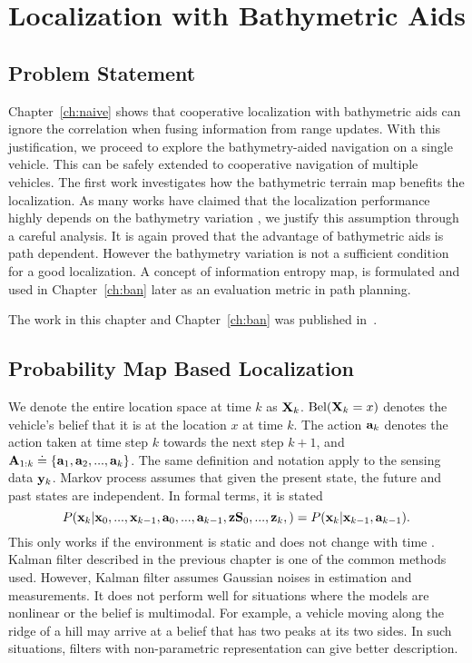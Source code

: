 \chapter{Localization with Bathymetric Aids}
\label{ch:bathymetry}


\section{Problem Statement}

Chapter~\ref{ch:naive} shows that cooperative localization with bathymetric aids can ignore the correlation when fusing information from range updates. With this justification, we proceed to explore the bathymetry-aided navigation on a single vehicle. This can be safely extended to cooperative navigation of multiple vehicles. The first work investigates how the bathymetric terrain map benefits the localization. As many works have claimed that the localization performance highly depends on the bathymetry variation \cite{Kalyan2013,Peng2016,Rodrigo2015,Galceran2013}, we justify this assumption through a careful analysis. It is again proved that the advantage of bathymetric aids is path dependent. However the bathymetry variation is not a sufficient condition for a good localization. A concept of information entropy map, is formulated and used in Chapter~\ref{ch:ban} later as an evaluation metric in path planning.

The work in this chapter and Chapter~\ref{ch:ban} was published in~\cite{Gao2018}.

\section{Probability Map Based Localization}

We denote the entire location space at time $k$ as ${\bf{X}}_k$. $\text{Bel}({\bf{X}}_k=x)$ denotes the vehicle's belief that it is at the location $x$ at time $k$. The action ${\bf{a}}_k$ denotes the action taken at time step $k$ towards the next step $k+1$, and ${\bf{A}}_{1:k}\doteq\{{\bf{a}}_1,{\bf{a}}_2,...,{\bf{a}}_k\}$. The same definition and notation apply
to the sensing data ${\bf{y}}_k$. Markov process assumes that given the present state, the future and past states are independent. In formal terms, it is stated
\begin{equation}
{P}({\bf x}_k|{\bf x}_0,...,{\bf x}_{k-1},{\bf a}_0,...,{\bf a}_{k-1},{\bf zS}_0,...,{\bf z}_{k},)={P}({\bf x}_k|{\bf x}_{k-1},{\bf a}_{k-1}).
\end{equation}
This only works if the environment is static and does not change with time \cite{Thrun2005}. Kalman filter described in the previous chapter is one of the common methods used. However, Kalman filter assumes Gaussian noises in estimation and measurements. It does not perform well for situations where the models are nonlinear or the belief is multimodal. For example, a vehicle moving along the ridge of a hill may arrive at a belief that has two peaks at its two sides. In such situations, filters with non-parametric representation can give better description.

